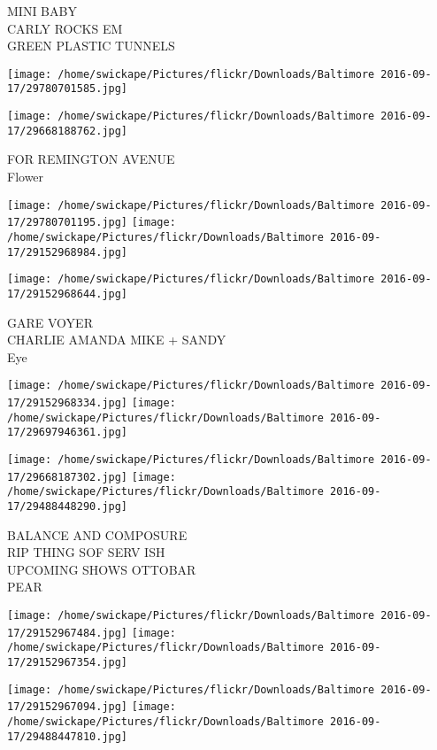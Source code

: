 \documentclass[10pt,letterpaper]{article}
\begin{document}
MINI BABY\\
CARLY ROCKS EM\\
GREEN PLASTIC TUNNELS
\pagebreak

\texttt{[image: /home/swickape/Pictures/flickr/Downloads/Baltimore 2016-09-17/29780701585.jpg]}

\vspace{0.25in}
\texttt{[image: /home/swickape/Pictures/flickr/Downloads/Baltimore 2016-09-17/29668188762.jpg]}

FOR REMINGTON AVENUE\\
Flower
\pagebreak

\texttt{[image: /home/swickape/Pictures/flickr/Downloads/Baltimore 2016-09-17/29780701195.jpg]}
\texttt{[image: /home/swickape/Pictures/flickr/Downloads/Baltimore 2016-09-17/29152968984.jpg]}

\vspace{0.25in}
\texttt{[image: /home/swickape/Pictures/flickr/Downloads/Baltimore 2016-09-17/29152968644.jpg]}

GARE VOYER\\
CHARLIE AMANDA MIKE + SANDY\\
Eye
\pagebreak

\texttt{[image: /home/swickape/Pictures/flickr/Downloads/Baltimore 2016-09-17/29152968334.jpg]}
\texttt{[image: /home/swickape/Pictures/flickr/Downloads/Baltimore 2016-09-17/29697946361.jpg]}

\texttt{[image: /home/swickape/Pictures/flickr/Downloads/Baltimore 2016-09-17/29668187302.jpg]}
\texttt{[image: /home/swickape/Pictures/flickr/Downloads/Baltimore 2016-09-17/29488448290.jpg]}

BALANCE AND COMPOSURE\\
RIP THING SOF SERV ISH\\
UPCOMING SHOWS OTTOBAR\\
PEAR
\pagebreak

\texttt{[image: /home/swickape/Pictures/flickr/Downloads/Baltimore 2016-09-17/29152967484.jpg]}
\texttt{[image: /home/swickape/Pictures/flickr/Downloads/Baltimore 2016-09-17/29152967354.jpg]}

\texttt{[image: /home/swickape/Pictures/flickr/Downloads/Baltimore 2016-09-17/29152967094.jpg]}
\texttt{[image: /home/swickape/Pictures/flickr/Downloads/Baltimore 2016-09-17/29488447810.jpg]}
\end{document}
